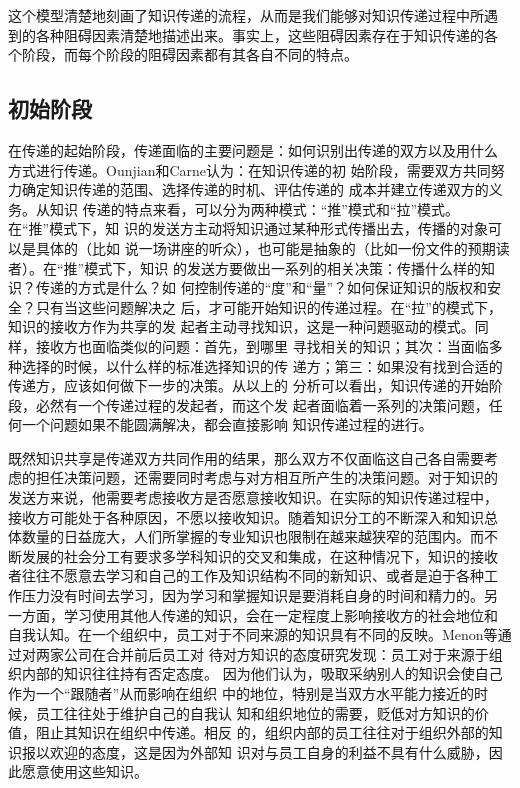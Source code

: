 \documentclass[12pt,a4paper]{Ctexart}
\begin{document}
这个模型清楚地刻画了知识传递的流程，从而是我们能够对知识传递过程中所遇
到的各种阻碍因素清楚地描述出来。事实上，这些阻碍因素存在于知识传递的各
个阶段，而每个阶段的阻碍因素都有其各自不同的特点。

\subsection{初始阶段}


在传递的起始阶段，传递面临的主要问题是：如何识别出传递的双方以及用什么
方式进行传递。Ounjian和Carne\cite{ounjian1987sfa}认为：在知识传递的初
始阶段，需要双方共同努力确定知识传递的范围、选择传递的时机、评估传递的
成本并建立传递双方的义务。从知识
传递的特点来看，可以分为两种模式：“推”模式和“拉”模式。在“推”模式下，知
识的发送方主动将知识通过某种形式传播出去，传播的对象可以是具体的（比如
说一场讲座的听众），也可能是抽象的（比如一份文件的预期读者）。在“推”模式下，知识
的发送方要做出一系列的相关决策：传播什么样的知识？传递的方式是什么？如
何控制传递的“度”和“量”？如何保证知识的版权和安全？只有当这些问题解决之
后，才可能开始知识的传递过程。在“拉”的模式下，知识的接收方作为共享的发
起者主动寻找知识，这是一种问题驱动的模式。同样，接收方也面临类似的问题：首先，到哪里
寻找相关的知识；其次：当面临多种选择的时候，以什么样的标准选择知识的传
递方；第三：如果没有找到合适的传递方，应该如何做下一步的决策。从以上的
分析可以看出，知识传递的开始阶段，必然有一个传递过程的发起者，而这个发
起者面临着一系列的决策问题，任何一个问题如果不能圆满解决，都会直接影响
知识传递过程的进行。

既然知识共享是传递双方共同作用的结果，那么双方不仅面临这自己各自需要考
虑的担任决策问题，还需要同时考虑与对方相互所产生的决策问题。对于知识的
发送方来说，他需要考虑接收方是否愿意接收知识。在实际的知识传递过程中，
接收方可能处于各种原因，不愿以接收知识。随着知识分工的不断深入和知识总
体数量的日益庞大，人们所掌握的专业知识也限制在越来越狭窄的范围内。而不
断发展的社会分工有要求多学科知识的交叉和集成，在这种情况下，知识的接收
者往往不愿意去学习和自己的工作及知识结构不同的新知识、或者是迫于各种工
作压力没有时间去学习，因为学习和掌握知识是要消耗自身的时间和精力的。另
一方面，学习使用其他人传递的知识，会在一定程度上影响接收方的社会地位和
自我认知。在一个组织中，员工对于不同来源的知识具有不同的反映。Menon等\cite{2203456620060801}通过对两家公司在合并前后员工对
待对方知识的态度研究发现：员工对于来源于组织内部的知识往往持有否定态度。
因为他们认为，吸取采纳别人的知识会使自己作为一个“跟随者”从而影响在组织
中的地位，特别是当双方水平能力接近的时候，员工往往处于维护自己的自我认
知和组织地位的需要，贬低对方知识的价值，阻止其知识在组织中传递。相反
的，组织内部的员工往往对于组织外部的知识报以欢迎的态度，这是因为外部知
识对与员工自身的利益不具有什么威胁，因此愿意使用这些知识。
\end{document}
